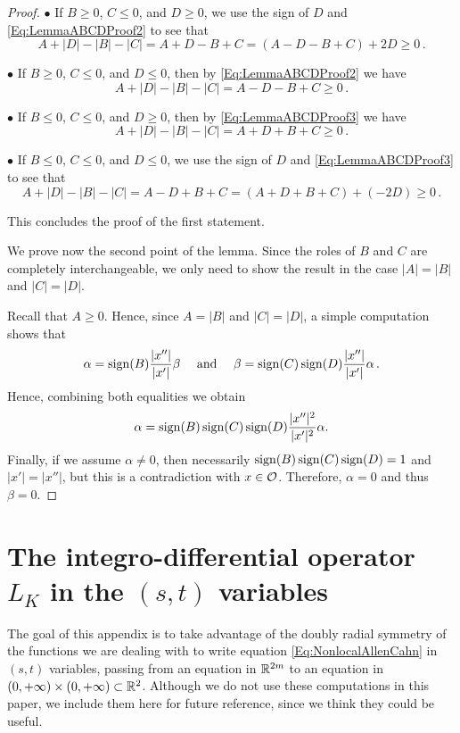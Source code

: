 \begin{proof}
$\bullet$ If $B \geq 0$, $C \leq 0$, and $D \geq 0$, we use the sign of $D$ and \eqref{Eq:LemmaABCDProof2} to see that
$$
A + |D| - |B| - |C| = A + D - B + C =  (A - D - B + C) + 2D \geq 0\,.
$$

$\bullet$ If $B \geq 0$, $C \leq 0$, and $D \leq 0$, then by \eqref{Eq:LemmaABCDProof2} we have
$$
A + |D| - |B| - |C| = A - D - B + C \geq 0\,.
$$

$\bullet$ If $B \leq 0$, $C \leq 0$, and $D \geq 0$, then by \eqref{Eq:LemmaABCDProof3} we have
$$
A + |D| - |B| - |C| = A + D + B + C \geq 0\,.
$$

$\bullet$ If $B \leq 0$, $C \leq 0$, and $D \leq 0$, we use the sign of $D$ and \eqref{Eq:LemmaABCDProof3} to see that
$$
A + |D| - |B| - |C| = A - D + B + C =  (A + D + B + C) + (-2D) \geq 0\,.
$$

This concludes the proof of the first statement.

We prove now the second point of the lemma. Since the roles of $B$ and $C$ are completely interchangeable, we only need to show the result in the case $|A| = |B|$ and $|C| = |D|$.

Recall that $A \geq 0$. Hence, since $A = |B|$ and $|C| = |D|$, a simple computation shows that
$$
\alpha = \operatorname{sign} (B) \dfrac{|x''|}{|x'|}\beta \quad \textrm{ and } \quad
\beta = \operatorname{sign} (C) \operatorname{sign}(D) \dfrac{|x''|}{|x'|} \alpha \,.
$$
Hence, combining both equalities we obtain
$$
\alpha = \operatorname{sign} (B) \operatorname{sign} (C) \operatorname{sign}(D) \dfrac{|x''|^2}{|x'|^2} \alpha.
$$
Finally, if we assume $\alpha \neq 0$, then necessarily $\operatorname{sign} (B) \operatorname{sign} (C) \operatorname{sign}(D)=1$ and $|x'|= |x''|$, but this is a contradiction with $x\in \mathcal{O}$. Therefore, $\alpha = 0$ and thus $\beta =0$.
\end{proof}








\section{The integro-differential operator $L_K$ in the $(s,t)$ variables}
\label{Sec:stcomputations}

The goal of this appendix is to take advantage of the doubly radial symmetry of the functions we
are dealing with to write equation \eqref{Eq:NonlocalAllenCahn} in $(s,t)$ variables, passing from
an equation in $\mathbb{R}^{2m}$ to an equation in $(0,+\infty)\times (0,+\infty)\subset \mathbb{R}^2$. Although we do not use these computations in this paper, we include them here for future reference, since we think they could be useful.

